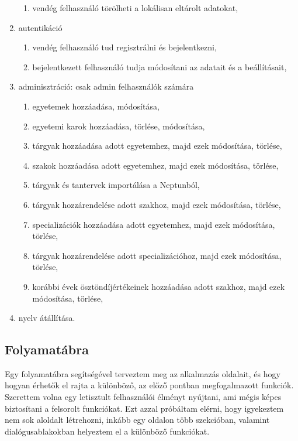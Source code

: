 \documentclass[a4paper,12pt]{report}
\begin{document}
\begin{enumerate}
\begin{enumerate}
        \item vendég felhasználó törölheti a lokálisan eltárolt adatokat,
    \end{enumerate}
    \item autentikáció
    \begin{enumerate}
        \item vendég felhasználó tud regisztrálni és bejelentkezni,
        \item bejelentkezett felhasználó tudja módosítani az adatait és a beállításait,
    \end{enumerate}
    \item adminisztráció: csak admin felhasználók számára
    \begin{enumerate}
        \item egyetemek hozzáadása, módosítása,
        \item egyetemi karok hozzáadása, törlése, módosítása,
        \item tárgyak hozzáadása adott egyetemhez, majd ezek módosítása, törlése,
        \item szakok hozzáadása adott egyetemhez, majd ezek módosítása, törlése,
        \item tárgyak és tantervek importálása a Neptunból,
        \item tárgyak hozzárendelése adott szakhoz, majd ezek módosítása, törlése,
        \item specializációk hozzáadása adott egyetemhez, majd ezek módosítása, törlése,
        \item tárgyak hozzárendelése adott specializációhoz, majd ezek módosítása, törlése,
        \item korábbi évek ösztöndíjértékeinek hozzáadása adott szakhoz, majd ezek módosítása, törlése,
    \end{enumerate}
    \item nyelv átállítása.
\end{enumerate}

\subsection{Folyamatábra}

Egy folyamatábra segítségével terveztem meg az alkalmazás oldalait, és hogy hogyan érhetők el rajta a különböző, az előző pontban megfogalmazott funkciók. Szerettem volna egy letisztult felhasználói élményt nyújtani, ami mégis képes biztosítani a felsorolt funkciókat. Ezt azzal próbáltam elérni, hogy igyekeztem nem sok aloldalt létrehozni, inkább egy oldalon több szekcióban, valamint dialógusablakokban helyeztem el a különböző funkciókat.
\end{document}

